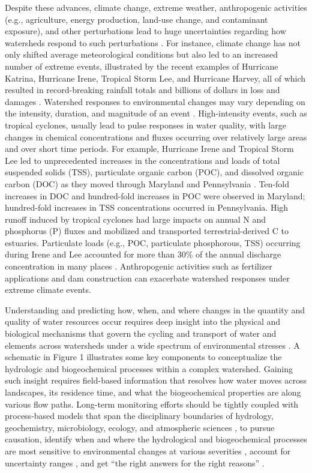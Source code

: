 \documentclass[preprint,review, 12pt]{elsarticle}
\begin{document}
Despite these advances, climate change, extreme weather, anthropogenic activities (e.g., agriculture, energy production, land-use change, and contaminant exposure), and other perturbations lead to huge uncertainties regarding how watersheds respond to such perturbations \citep{Page2012}. For instance, climate change has not only shifted average meteorological conditions but also led to an increased number of extreme events, illustrated by the recent examples of Hurricane Katrina, Hurricane Irene, Tropical Storm Lee, and Hurricane Harvey, all of which resulted in record-breaking rainfall totals and billions of dollars in loss and damages \citep{Vidon2018, Paerl2018b}. Watershed responses to environmental changes may vary depending on the intensity, duration, and magnitude of an event \citep{Kaushal2018g}. High-intensity events, such as tropical cyclones, usually lead to pulse responses in water quality, with large changes in chemical concentrations and fluxes occurring over relatively large areas and over short time periods. For example, Hurricane Irene and Tropical Storm Lee led to unprecedented increases in the concentrations and loads of total suspended solids (TSS), particulate organic carbon (POC), and dissolved organic carbon (DOC) as they moved through Maryland and Pennsylvania \citep{Vidon2018}. Ten-fold increases in DOC and hundred-fold increases in POC were observed in Maryland; hundred-fold increases in TSS concentrations occurred in Pennsylvania. High runoff induced by tropical cyclones had large impacts on annual N and phosphorus (P) fluxes and mobilized and transported terrestrial-derived C to estuaries. Particulate loads (e.g., POC, particulate phosphorous, TSS) occurring during Irene and Lee accounted for more than 30\% of the annual discharge concentration in many places \citep{Paerl2018b}. Anthropogenic activities such as fertilizer applications and dam construction can exacerbate watershed responses under extreme climate events.

 Understanding and predicting how, when, and where changes in the quantity and quality of water resources occur requires deep insight into the physical and biological mechanisms that govern the cycling and transport of water and elements across watersheds under a wide spectrum of environmental stresses \citep{Laudon2018b}. A schematic in Figure 1 illustrates some key components to conceptualize the hydrologic and biogeochemical processes within a complex watershed. Gaining such insight requires field-based information that resolves how water moves across landscapes, its residence time, and what the biogeochemical properties are along various flow paths. Long-term monitoring efforts should be tightly coupled with process-based models that span the disciplinary boundaries of hydrology, geochemistry, microbiology, ecology, and atmospheric sciences \citep{Bao2017b, Seibert2002}, to pursue causation, identify when and where the hydrological and biogeochemical processes are most sensitive to environmental changes at various severities \citep{Laudon2018b, Murdoch2014}, account for uncertainty ranges \citep{Fatichi2016}, and get “the right answers for the right reasons” \citep{kirchner2006getting}.  
 
\end{document}
